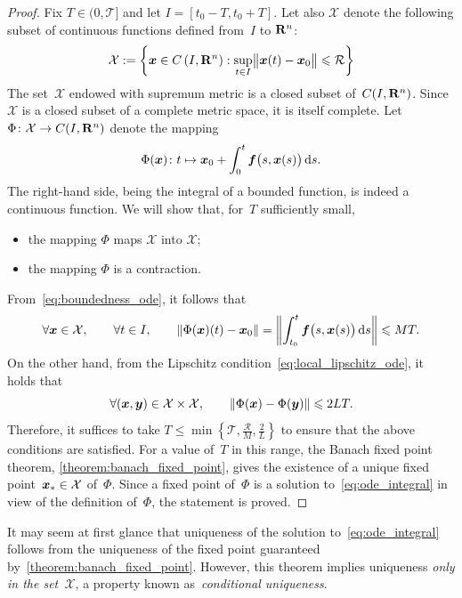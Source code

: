 \begin{proof}
    Fix $T \in (0, \mathcal T]$ and let $I = [t_0 - T, t_0 + T]$.
    Let also $\mathcal X$ denote the following subset of continuous functions defined from~$I$ to $\real^n$:
    \[
    \mathcal X := \left\{ \vect x\in C\left(I, \real^n\right) : \sup_{t \in I} \norm[\big]{\vect x(t) - \vect x_0} \leq \mathcal R \right\}
    \]
    The set~$\mathcal X$ endowed with supremum metric is a closed subset of~$C(I, \real^n)$.
    Since $\mathcal X$ is a closed subset of a complete metric space,
    it is itself complete.
    Let $\Phi \colon \mathcal X \to C(I, \real^n)$ denote the mapping
    \[
        \Phi(\vect x) \colon  t \mapsto  \vect x_0 + \int_{0}^{t} \vect f\bigl(s, \vect x(s)\bigr) \, \d s.
    \]
    The right-hand side, being the integral of a bounded function,
    is indeed a continuous function.
    We will show that, for~$T$ sufficiently small,
    \begin{itemize}
        \item the mapping $\Phi$ maps $\mathcal X$ into $\mathcal X$;
        \item the mapping $\Phi$ is a contraction.
    \end{itemize}
    From~\eqref{eq:boundedness_ode},
    it follows that
    \[
        \forall \vect x \in \mathcal X, \qquad
        \forall t \in I, \qquad
        \vecnorm*{\Phi(\vect x)(t) - \vect x_0} = \vecnorm*{ \int_{t_0}^{t} \vect f\bigl(s, \vect x(s)\bigr) \, \d s }
        \leq M T.
    \]
    On the other hand, from the Lipschitz condition~\eqref{eq:local_lipschitz_ode},
    it holds that
    \[
        \forall (\vect x, \vect y) \in \mathcal X \times \mathcal X, \qquad
        \norm{\Phi(\vect x) - \Phi(\vect y)} \leq 2 L T.
    \]
    Therefore, it suffices to take $T \leq \min \left\{ \mathcal T, \frac{\mathcal R}{M}, \frac{2}{L} \right\}$ to ensure that the above conditions are satisfied.
    For a value of~$T$ in this range,
    the Banach fixed point theorem, \cref{theorem:banach_fixed_point},
    gives the existence of a unique fixed point~$\vect x_* \in \mathcal X$ of~$\Phi$.
    Since a fixed point of~$\Phi$ is a solution to~\eqref{eq:ode_integral} in view of the definition of~$\Phi$,
    the statement is proved.
\end{proof}
It may seem at first glance that uniqueness of the solution to~\eqref{eq:ode_integral} follows from the uniqueness of the fixed point guaranteed by~\cref{theorem:banach_fixed_point}.
However, this theorem implies uniqueness \emph{only in the set~$\mathcal X$},
a property known as~\emph{conditional uniqueness}.
